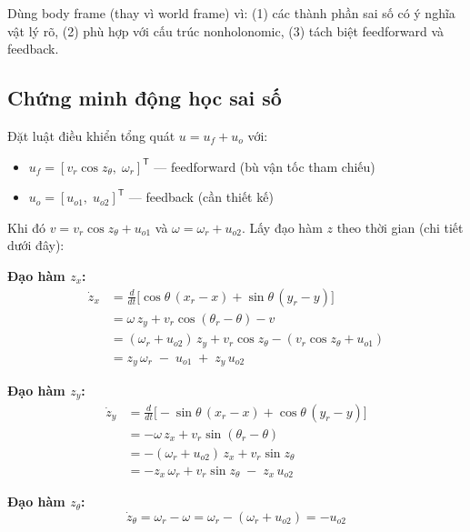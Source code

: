 \documentclass[12pt,a4paper]{article}
\newcommand{\T}{\mathsf{T}}
\begin{document}
Dùng body frame (thay vì world frame) vì: (1) các thành phần sai số có ý nghĩa vật lý rõ, (2) phù hợp với cấu trúc nonholonomic, (3) tách biệt feedforward và feedback.

\subsection{Chứng minh động học sai số}

Đặt luật điều khiển tổng quát $u = u_f + u_o$ với:
\begin{itemize}[nosep]
    \item $u_f = [v_r\cos z_\theta,\; \omega_r]^\T$ --- feedforward (bù vận tốc tham chiếu)
    \item $u_o = [u_{o1},\; u_{o2}]^\T$ --- feedback (cần thiết kế)
\end{itemize}

Khi đó $v = v_r\cos z_\theta + u_{o1}$ và $\omega = \omega_r + u_{o2}$. Lấy đạo hàm $z$ theo thời gian (chi tiết dưới đây):

\textbf{Đạo hàm $z_x$:}
\begin{align}
    \dot{z}_x &= \frac{d}{dt}\big[\cos\theta\,(x_r{-}x) + \sin\theta\,(y_r{-}y)\big] \nonumber \\
    &= \omega\, z_y + v_r\cos(\theta_r{-}\theta) - v \nonumber \\
    &= (\omega_r{+}u_{o2})\,z_y + v_r\cos z_\theta - (v_r\cos z_\theta + u_{o1}) \nonumber \\
    &= z_y\,\omega_r \;-\; u_{o1} \;+\; z_y\,u_{o2} \label{eq:dzx}
\end{align}

\textbf{Đạo hàm $z_y$:}
\begin{align}
    \dot{z}_y &= \frac{d}{dt}\big[-\sin\theta\,(x_r{-}x) + \cos\theta\,(y_r{-}y)\big] \nonumber \\
    &= -\omega\, z_x + v_r\sin(\theta_r{-}\theta) \nonumber \\
    &= -(\omega_r{+}u_{o2})\,z_x + v_r\sin z_\theta \nonumber \\
    &= -z_x\,\omega_r + v_r\sin z_\theta \;-\; z_x\,u_{o2} \label{eq:dzy}
\end{align}

\textbf{Đạo hàm $z_\theta$:}
\begin{equation}\label{eq:dzth}
    \dot{z}_\theta = \omega_r - \omega = \omega_r - (\omega_r + u_{o2}) = -u_{o2}
\end{equation}
\end{document}
